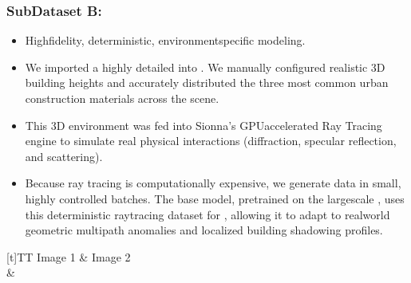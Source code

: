 \documentclass[letterpaper,10pt,english]{sphinxmanual}
\begin{document}
\subsubsection{Sub\sphinxhyphen{}Dataset B: }
\label{\detokenize{dataset:sub-dataset-b-ray-tracing-simulation}}\begin{itemize}
\item {} 
\sphinxAtStartPar
{} High\sphinxhyphen{}fidelity, deterministic, environment\sphinxhyphen{}specific modeling.

\item {} 
\sphinxAtStartPar
{} We imported a highly detailed  into . We manually configured realistic 3D building heights and accurately distributed the three most common urban construction materials across the scene.

\item {} 
\sphinxAtStartPar
{} This 3D environment was fed into Sionna’s GPU\sphinxhyphen{}accelerated Ray Tracing engine to simulate real physical interactions (diffraction, specular reflection, and scattering).

\item {} 
\sphinxAtStartPar
{} Because ray tracing is computationally expensive, we generate data in small, highly controlled batches. The base model, pre\sphinxhyphen{}trained on the large\sphinxhyphen{}scale , uses this deterministic ray\sphinxhyphen{}tracing dataset for , allowing it to adapt to real\sphinxhyphen{}world geometric multipath anomalies and localized building shadowing profiles.

\end{itemize}


\begin{savenotes}\sphinxattablestart
\sphinxthistablewithglobalstyle
\centering
\begin{tabulary}{\linewidth}[t]{TT}
\sphinxtoprule
\sphinxstyletheadfamily 
\sphinxAtStartPar
Image 1
&\sphinxstyletheadfamily 
\sphinxAtStartPar
Image 2
\\
\sphinxmidrule
\sphinxtableatstartofbodyhook
\sphinxAtStartPar
{}
&
\sphinxAtStartPar
{}
\\
\sphinxbottomrule
\end{tabulary}
\sphinxtableafterendhook\par
\sphinxattableend\end{savenotes}
\end{document}
